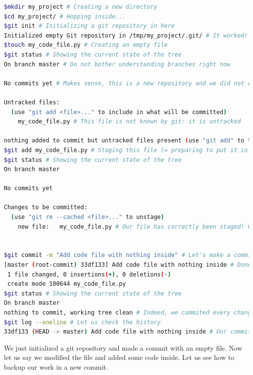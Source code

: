 \documentclass[12pt]{article}
\begin{document}
\begin{lstlisting}[language=bash]
$mkdir my_project # Creating a new directory
$cd my_project/ # Hopping inside...
$git init # Initializing a git repository in here
Initialized empty Git repository in /tmp/my_project/.git/ # It worked!
$touch my_code_file.py # Creating an empty file
$git status # Showing the current state of the tree
On branch master # Do not bother understanding branches right now

No commits yet # Makes sense, this is a new repository and we did not commit anything yet

Untracked files:
  (use "git add <file>..." to include in what will be committed)
	my_code_file.py # This file is not known by git: it is untracked

nothing added to commit but untracked files present (use "git add" to track)
$git add my_code_file.py # Staging this file (= preparing to put it in a future commit)
$git status # Showing the current state of the tree
On branch master

No commits yet

Changes to be committed:
  (use "git rm --cached <file>..." to unstage)
	new file:   my_code_file.py # Our file has correctly been staged! Our commit is now ready to be made :)


$git commit -m "Add code file with nothing inside" # Let's make a commit with our little file now
[master (root-commit) 33df133] Add code file with nothing inside # Done :)
 1 file changed, 0 insertions(+), 0 deletions(-)
 create mode 100644 my_code_file.py
$git status # Showing the current state of the tree
On branch master
nothing to commit, working tree clean # Indeed, we commited every change we made. No file has been modified since the last commit so everything is up-to-date.
$git log --oneline # Let us check the history
33df133 (HEAD -> master) Add code file with nothing inside # Our commit is just there. If we continue adding or modifying files and comitting them, we will have an history of all of our commits :)
\end{lstlisting}

We just initialized a git repository and made a commit with an empty file. Now let us say we modified the file and added some code inside. Let us see how to backup our work in a new commit.
\end{document}
